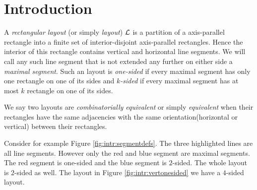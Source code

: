 
\section{Introduction}
\thispagestyle{plain}

  A  \emph{rectangular layout} (or simply \emph{layout}) $\mathcal{L}$ is a partition of a axis-parallel rectangle into a finite set of interior-disjoint axis-parallel rectangles. Hence the interior of this rectangle contains vertical and horizontal line segments. We will call any such line segment that is not extended any further on either side a \emph{maximal segment}. Such an layout is \emph{one-sided} if every maximal segment has only one rectangle on one of its sides and \emph{$k$-sided} if every maximal segment has at most $k$ rectangle on one of its sides.

  We say two layouts are  \emph{combinatorially equivalent} or simply \emph{equivalent} when their rectangles have the same adjacencies with the same orientation(horizontal or vertical) between their rectangles.

  Consider for example Figure \ref{fig:intr:segmentdefs}. The three highlighted lines are all line segments. However only the red and blue segment are maximal segments. The red segment is one-sided and the blue segment is $2$-sided. The whole layout is $2$-sided as well. The layout in Figure \ref{fig:intr:vertonesided} we have a $4$-sided layout.

